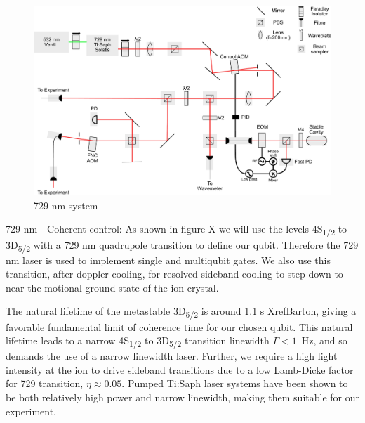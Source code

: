 \documentclass[12pt]{iopart}
\begin{document}
\begin{figure}
  \begin{center}
   \noindent\includegraphics[width=\linewidth]{figures/729_path_small.pdf}
  \end{center}
  \caption{729 nm system}
  \label{fig:can}
\end{figure}

729 nm - Coherent control: As shown in figure X we will use the levels
4S\textsubscript{1/2} to 3D\textsubscript{5/2} with a 729 nm
quadrupole transition to define our qubit. Therefore the 729 nm laser
is used to implement single and multiqubit gates. We also use this
transition, after doppler cooling, for resolved sideband cooling to
step down to near the motional ground state of the ion crystal.

The natural lifetime of the metastable
3D\textsubscript{5/2} is around 1.1 s XrefBarton, giving a favorable
fundamental limit of coherence time for our chosen qubit.
This natural lifetime leads to a narrow 4S\textsubscript{1/2} to
3D\textsubscript{5/2} transition linewidth $\Gamma < 1$~Hz, and so
demands the use of a narrow linewidth laser. Further, we require a
high light intensity at the ion to drive sideband transitions due to a low
Lamb-Dicke factor for 729 transition, $\eta \approx 0.05$.
Pumped Ti:Saph laser systems have been shown to be both relatively
high power and narrow linewidth, making them suitable for our
experiment.
\end{document}
